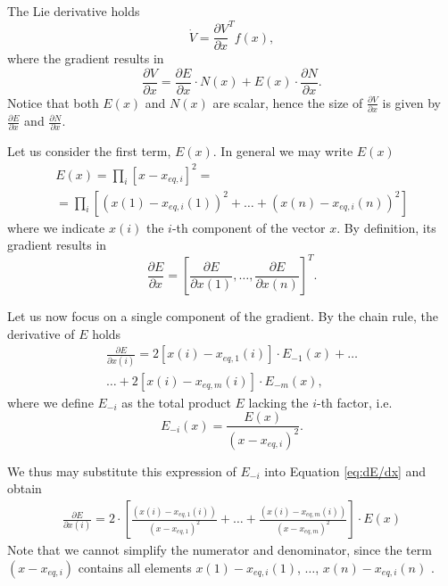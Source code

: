 \documentclass[]{article}
\begin{document}
The Lie derivative holds
\begin{equation}
\dot{V} = \frac{\partial V}{\partial x} ^T f(x), 
\end{equation}
where the gradient results in
\begin{equation}
\label{eq:gradient-V}
\frac{\partial V}{\partial x} = 
\frac{\partial E}{\partial x}   \cdot N(x) 
+
E(x) \cdot \frac{\partial N}{\partial x}.
\end{equation}
Notice that both $E(x)$ and $N(x)$ are scalar, hence the size of $\frac{\partial V}{\partial x}$ is given by $\frac{\partial E}{\partial x}$ and $\frac{\partial N}{\partial x}$.

Let us consider the first term, $E(x)$. 
In general we may write $E(x)$
\begin{multline}
\label{eq:definition-E}
E(x) 
= 
\prod_i [x - x_{eq, i}]^2 
= 
\\
=
\prod_i [ (x(1) - x_{eq, i}(1))^2 + \dots + (x(n) - x_{eq, i}(n))^2 ]
\end{multline}
where we indicate $x(i)$ the $i$-th component of the vector $x$. 
%
By definition, its gradient results in
%
\begin{equation}
\label{eq:dE/dx - clean}
\frac{\partial E}{\partial x} 
= 
\left[
\frac{\partial E}{\partial x(1)}, \dots, \frac{\partial E}{\partial x(n)}
\right]^T.
\end{equation}



Let us now focus on a single component of the gradient.
By the chain rule, the derivative of $E$ holds 
\begin{multline}
\label{eq:dE/dx}
\frac{\partial E}{\partial x(i)} = 
2 [x(i) - x_{eq, 1}(i)] \cdot E_{-1}(x) + \dots
\\ 
\dots + 
2 [x(i) - x_{eq, m}(i)] \cdot E_{-m}(x),
\end{multline}
where we define $E_{-i}$ as the total product $E$ lacking the $i$-th factor, i.e. 
\begin{equation}
E_{-i}(x) = 
\frac{E(x)}{(x-x_{eq, i})^2}.
\end{equation}


We thus may substitute this expression of $E_{-i}$ into 
 Equation \eqref{eq:dE/dx} and obtain 
\begin{multline}
\label{eq:dE/dx - code}
\frac{\partial E}{\partial x(i)} = 
2 \cdot 
\left[
 \frac{(x(i) - x_{eq, 1}(i))}{(x - x_{eq, 1})^2} + \dots + 
 \frac{(x(i) - x_{eq, m}(i))}{(x - x_{eq, m})^2}
\right]
\cdot E(x) 
\end{multline}
Note that we cannot simplify the numerator and denominator, since the term $(x - x_{eq, i})$ contains all elements $x(1) - x_{eq, i}(1)$, $\dots$, $x(n) - x_{eq, i}(n)$ .
\end{document}

